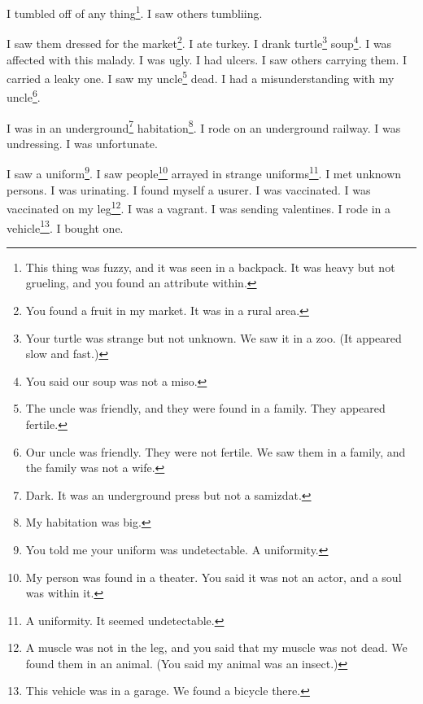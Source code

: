\documentclass[12pt]{book}
\begin{document}
 I tumbled off of any thing\footnote{This thing was fuzzy, and it was seen in a backpack. It was heavy but not grueling, and you found an attribute within.}. I saw others tumbliing. 

 I saw them dressed for the market\footnote{You found a fruit in my market. It was in a rural area.}. I ate turkey. I drank turtle\footnote{Your turtle was strange but not unknown. We saw it in a zoo. (It appeared slow and fast.)} soup\footnote{You said our soup was not a miso.}. I was affected with this malady. I was ugly. I had ulcers. I saw others carrying them. I carried a leaky one. I saw my uncle\footnote{The uncle was friendly, and they were found in a family. They appeared fertile.} dead. I had a misunderstanding with my uncle\footnote{Our uncle was friendly. They were not fertile. We saw them in a family, and the family was not a wife.}. 

 I was in an underground\footnote{Dark. It was an underground press but not a samizdat.} habitation\footnote{My habitation was big.}. I rode on an underground railway. I was undressing. I was unfortunate. 

 I saw a uniform\footnote{You told me your uniform was undetectable. A uniformity.}. I saw people\footnote{My person was found in a theater. You said it was not an actor, and a soul was within it.} arrayed in strange uniforms\footnote{A uniformity. It seemed undetectable.}. I met unknown persons. I was urinating. I found myself a usurer. I was vaccinated. I was vaccinated on my leg\footnote{A muscle was not in the leg, and you said that my muscle was not dead. We found them in an animal. (You said my animal was an insect.)}. I was a vagrant. I was sending valentines. I rode in a vehicle\footnote{This vehicle was in a garage. We found a bicycle there.}. I bought one. 
\end{document}
